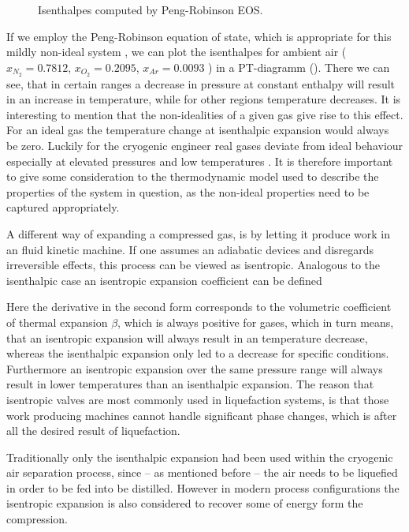        \begin{figure}
            \center
            
            \caption{Isenthalpes computed by Peng-Robinson EOS.}
            \label{fig:pr_isenthalpes}
        \end{figure}

        If we employ the Peng-Robinson equation of state, which is appropriate for this mildly non-ideal system
        \cite{AndreasPfennig.2003}, we can plot the isenthalpes for ambient air ($x_{N_2}=0.7812$, $x_{O_2}=0.2095$,
        $x_{Ar}=0.0093$ ) in a PT-diagramm ().
        There we can see, that in certain ranges a decrease in pressure at constant enthalpy will result
        in an increase in temperature, while for other regions temperature decreases. It is interesting
        to mention that the non-idealities of a given gas give rise to this effect. For an ideal gas the
        temperature change at isenthalpic expansion would always be zero. Luckily for the cryogenic engineer
        real gases deviate from ideal behaviour especially at elevated pressures and low temperatures \cite{Barron.1985}.
        It is therefore important to give some consideration to the thermodynamic model used to describe the properties
        of the system in question, as the non-ideal properties need to be captured appropriately.

        A different way of expanding a compressed gas, is by letting it produce work in an fluid kinetic machine.
        If one assumes an adiabatic devices and disregards irreversible effects, this process can be viewed as
        isentropic. Analogous to the isenthalpic case an isentropic expansion coefficient can be defined

        Here the derivative in the second form corresponds to the volumetric coefficient of thermal expansion
        $\beta$, which is always positive for gases, which in turn means, that an isentropic expansion
        will always result in an temperature decrease, whereas the isenthalpic expansion only led to a decrease for
        specific conditions. Furthermore an isentropic expansion over the same pressure range will always result in
        lower temperatures than an isenthalpic expansion. The reason that isentropic valves are most commonly used
        in liquefaction systems, is that those work producing machines cannot handle significant phase changes,
        which is after all the desired result of liquefaction.

        Traditionally only the isenthalpic expansion had been used within the cryogenic air separation process,
        since -- as mentioned before -- the air needs to be liquefied in order to be fed into be distilled. However
        in modern process configurations the isentropic expansion is also considered to recover some of energy
        form the compression.
